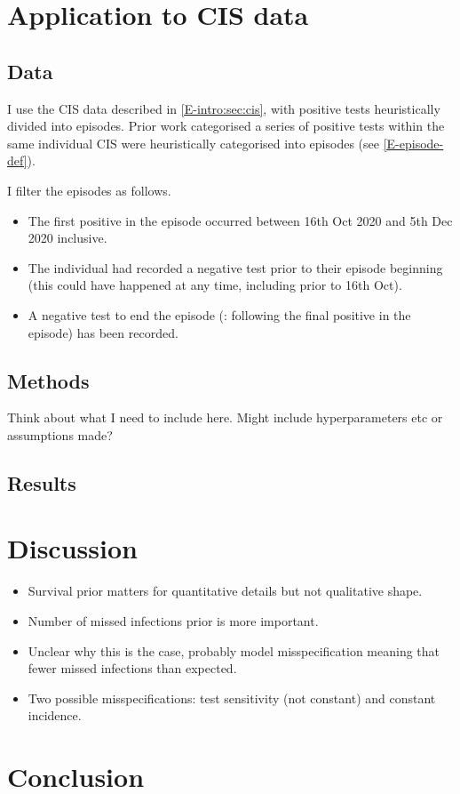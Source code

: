 \documentclass[thesis.tex]{subfiles}
\begin{document}
\section{Application to CIS data} \label{imperf-test:sec:application}

\subsection{Data}

I use the CIS data described in \cref{E-intro:sec:cis}, with positive tests heuristically divided into episodes.
Prior work categorised a series of positive tests within the same individual CIS were heuristically categorised into episodes (see \cref{E-episode-def}).

I filter the episodes as follows.
\begin{itemize}
\item
  The first positive in the episode occurred between 16th Oct 2020 and
  5th Dec 2020 inclusive.
\item
  The individual had recorded a negative test prior to their episode
  beginning (this could have happened at any time, including prior to
  16th Oct).
\item
  A negative test to end the episode (\ie: following the final positive in the episode) has been recorded.
\end{itemize}


\subsection{Methods}

Think about what I need to include here.
Might include hyperparameters etc or assumptions made?

\subsection{Results}

\section{Discussion} \label{imperf-test:sec:discussion}

\begin{itemize}
  \item Survival prior matters for quantitative details but not qualitative shape. 
  \item Number of missed infections prior is more important.
  \item Unclear why this is the case, probably model misspecification meaning that fewer missed infections than expected.
  \item Two possible misspecifications: test sensitivity (not constant) and constant incidence.
\end{itemize}

\section{Conclusion} \label{imperf-test:sec:conclusion}

\ifSubfilesClassLoaded{
  \listoftodos
}{}
\end{document}
